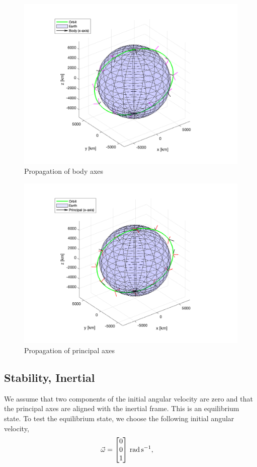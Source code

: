\begin{figure}[H]
\centering
\includegraphics[scale=0.7]{Images/ps3_problem7c_body.png}
\caption{Propagation of body axes}
\label{fig:ps3_problem7c_body}
\end{figure}

\begin{figure}[H]
\centering
\includegraphics[scale=0.7]{Images/ps3_problem7c_principal.png}
\caption{Propagation of principal axes}
\label{fig:ps3_problem7c_principal}
\end{figure}

\subsection{Stability, Inertial}
We assume that two components of the initial angular velocity are zero and that the principal axes are aligned with the inertial frame. This is an equilibrium state. To test the equilibrium state, we choose the following initial angular velocity,
\begin{align*}
\Vec{\omega} &= 
\qty[parse-numbers = false]{
    \begin{bmatrix}
    0 \\
    0 \\
    1 \\ 
    \end{bmatrix}
}{\radian\per\s},
\end{align*}

